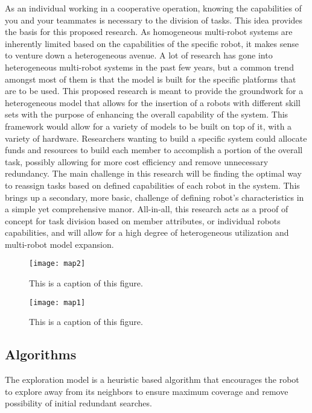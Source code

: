 As an individual working in a cooperative operation, knowing the capabilities
of you and your teammates is necessary to the division of tasks. This idea
provides the basis for this proposed research. As homogeneous multi-robot systems
are inherently limited based on the capabilities of the specific robot,
it makes sense to venture down a heterogeneous avenue. A lot of research
has gone into heterogeneous multi-robot systems in the past few years, but a
common trend amongst most of them is that the model is built for the specific
platforms that are to be used. This proposed research is meant to provide the
groundwork for a heterogeneous model that allows for the insertion of a
robots with different skill sets with the purpose of enhancing the overall
capability of the system. This framework would allow for a variety of models
to be built on top of it, with a variety of hardware. Researchers wanting to
build a specific system could allocate funds and resources to build each member
to accomplish a portion of the overall task, possibly allowing for more cost
efficiency and remove unnecessary redundancy. The main challenge in this
research will be finding the optimal way to reassign tasks based on defined
capabilities of each robot in the system. This brings up a secondary, more basic,
challenge of defining robot’s characteristics in a simple yet comprehensive manor.
All-in-all, this research acts as a proof of concept for task division based on member
attributes, or individual robots capabilities, and will allow for a high degree of
heterogeneous utilization and multi-robot model expansion.

\begin{figure}[H]
  \centering
    \texttt{[image: map2]}
  \caption{This is a caption of this figure.}
  \label{fig:something1}
\end{figure}

\begin{figure}[H]
  \centering
    \texttt{[image: map1]}
  \caption{This is a caption of this figure.}
  \label{fig:something2}
\end{figure}

\subsection{Algorithms}

The exploration model is a heuristic based algorithm that encourages the robot to explore
away from its neighbors to ensure maximum coverage and remove possibility of initial
redundant searches.

